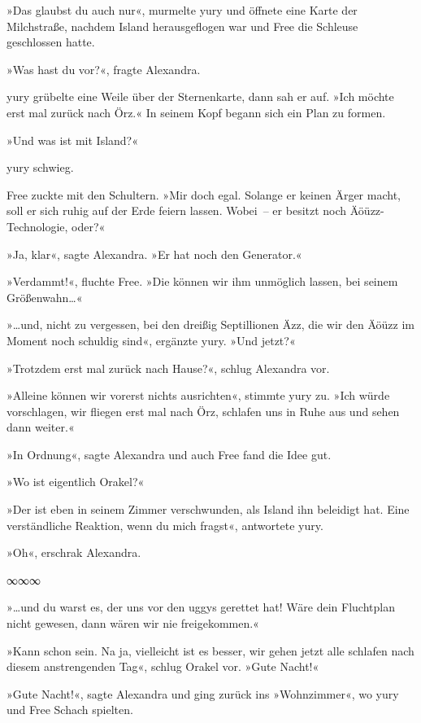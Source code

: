»Das glaubst du auch nur«, murmelte yury und öffnete eine Karte der Milchstraße, nachdem Island herausgeflogen war und Free die Schleuse geschlossen hatte.

»Was hast du vor?«, fragte Alexandra.

yury grübelte eine Weile über der Sternenkarte, dann sah er auf. »Ich möchte erst mal zurück nach Örz.« In seinem Kopf begann sich ein Plan zu formen.

»Und was ist mit Island?«

yury schwieg.

Free zuckte mit den Schultern. »Mir doch egal. Solange er keinen Ärger macht, soll er sich ruhig auf der Erde feiern lassen. Wobei~– er besitzt noch Äöüzz-Technologie, oder?«

»Ja, klar«, sagte Alexandra. »Er hat noch den Generator.«

»Verdammt!«, fluchte Free. »Die können wir ihm unmöglich lassen, bei seinem Größenwahn…«

»…und, nicht zu vergessen, bei den dreißig Septillionen Äzz, die wir den Äöüzz im Moment noch schuldig sind«, ergänzte yury. »Und jetzt?«

»Trotzdem erst mal zurück nach Hause?«, schlug Alexandra vor.

»Alleine können wir vorerst nichts ausrichten«, stimmte yury zu. »Ich würde vorschlagen, wir fliegen erst mal nach Örz, schlafen uns in Ruhe aus und sehen dann weiter.«

»In Ordnung«, sagte Alexandra und auch Free fand die Idee gut.

»Wo ist eigentlich Orakel?«

»Der ist eben in seinem Zimmer verschwunden, als Island ihn beleidigt hat. Eine verständliche Reaktion, wenn du mich fragst«, antwortete yury.

»Oh«, erschrak Alexandra.

\begin{center}
    ∞∞∞
\end{center}

»…und du warst es, der uns vor den uggys gerettet hat! Wäre dein Fluchtplan nicht gewesen, dann wären wir nie freigekommen.«

»Kann schon sein. Na ja, vielleicht ist es besser, wir gehen jetzt alle schlafen nach diesem anstrengenden Tag«, schlug Orakel vor. »Gute Nacht!«

»Gute Nacht!«, sagte Alexandra und ging zurück ins »Wohnzimmer«, wo yury und Free Schach spielten.

